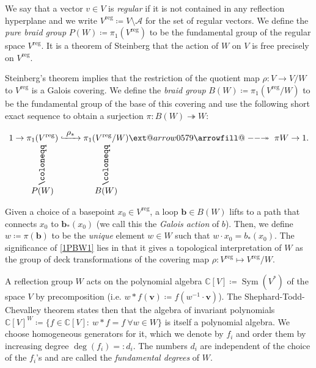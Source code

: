 \documentclass[ALCO, Unicode]{cedram}
\makeatletter
\newcommand{\op}[1]{\operatorname{#1}}
\newcommand{\CC}{\mathbb{C}}
\providecommand*{\twoheadrightarrowfill@}{%
  \arrowfill@\relbar\relbar\twoheadrightarrow
}
\providecommand*{\xtwoheadrightarrow}[2][]{%
  \ext@arrow 0579\twoheadrightarrowfill@{#1}{#2}%
}
\newcommand{\op}[1]{\operatorname{#1}}
\makeatother
\begin{document}
We say that a vector $v\in V$ is {\it regular} if it is not contained in any reflection hyperplane and we write $V^{\op{reg}}\coloneqq V\setminus \mathcal{A}$ for the set of regular vectors. We define the {\it pure braid group} $P(W)\coloneqq \pi_1(V^{\op{reg}})$ to be the fundamental group of the regular space $V^{\op{reg}}$. It is a theorem of Steinberg that the action of $W$ on $V$ is free precisely on $V^{\op{reg}}$. 

Steinberg's theorem \cite[\S~4.2.3]{broue-book-braid-groups} implies that the restriction of the quotient map $\rho: V\rightarrow V/W$ to $V^{\op{reg}}$ is a Galois covering. We define the {\it \color{blue} braid group} $B(W)\coloneqq \pi_1(V^{\op{reg}}/W)$ to be the fundamental group of the base of this covering and use the following short exact sequence \cite[(2.10)]{broue-malle-rouquier-braid-hecke} to obtain a surjection $\pi:B(W)\twoheadrightarrow W$:

\begin{equation}\label{1PBW1}
1\rightarrow\underset{\overset{\rotatebox{90}{$\coloneqq$}}{\displaystyle P(W)}}{\pi_1(V^{\op{reg}})}\lhook\joinrel\xrightarrow{\ \displaystyle \rho_*\ }
\underset{\overset{\rotatebox{90}{$\coloneqq$}}{\displaystyle B(W)}}{\pi_1(V^{\op{reg}}/W)}
\xtwoheadrightarrow{\ \displaystyle \pi} W\rightarrow 1.
\end{equation}


Given a choice of a basepoint $x_0\in V^{\op{reg}}$, a loop $\bm b\in B(W)$ lifts to a path that connects $x_0$ to $\bm b_*(x_0)$ (we call this the {\it Galois action} of $b$). Then, we define $w\coloneqq \pi(\bm b)$ to be the {\it unique} element $w\in W$ such that $w\cdot x_0=b_*(x_0)$. The significance of \eqref{1PBW1} lies in that it gives a topological interpretation of $W$ as the group of deck transformations of the covering map $\rho:V^{\op{reg}}\mapsto V^{\op{reg}}/W$.

A reflection group $W$ acts on the polynomial algebra $\CC[V]\coloneqq \op{Sym}(V^*)$ of the  space $V$ by precomposition (i.e. $w*f(\bm v)\coloneqq f(w^{-1}\cdot \bm v)$). The Shephard-Todd-Chevalley theorem \cite{shephard-and-todd,chevalley-improves-Shep-and-Todd} states then that the algebra of invariant polynomials $\CC[V]^W\coloneqq \{f\in\CC[V]:\ w*f=f\ \forall w\in W\}$ is itself a polynomial algebra. We choose homogeneous generators for it, which we denote by $f_i$ and order them by increasing degree $\op{deg}(f_i)=:d_i$. The numbers $d_i$ are independent of the choice of the $f_i$'s and are called the {\it \color{blue} fundamental degrees} of $W$.
\end{document}
